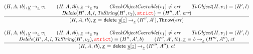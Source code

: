 \[\begin{array}{l@{~~}l@{~~}ll}
\frac{\begin{matrix}
\evale, \ir{y} \rightarrow_{\ir\expr} v_1
\rulesep
\evale, \ir{z} \rightarrow_{\ir\expr} v_2
\rulesep
\hf{CheckObjectCoercible}(v_1) \not= \err
\rulesep
\hf{ToObject}(H, v_1) = (H',l)
\\
\hf{Delete}(H', A, l, \hf{ToString}(H',v_2), \strict) = (H'', A', \err)
\end{matrix}}{\begin{matrix}
\state, \irdelprop \rightarrow_{\ir\stmt} (H'',A'), \error
\end{matrix}}
\\\\

\frac{\begin{matrix}
\evale, \ir{y} \rightarrow_{\ir\expr} v_1
\rulesep
\evale, \ir{z} \rightarrow_{\ir\expr} v_2
\rulesep
\hf{CheckObjectCoercible}(v_1) \not= \err
\rulesep
\hf{ToObject}(H, v_1) = (H',l)
\\
\hf{Delete}(H', A, l, \hf{ToString}(H',v_2), \strict) = (H'', A', b)
\rulesep
(H'',A',\tb), \irid \ {\tt =} \ b \rightarrow_{\ir\stmt} (H''',A''), \ct
\end{matrix}}{\begin{matrix}
\state, \irdelprop \rightarrow_{\ir\stmt} (H''',A''), \ct
\end{matrix}}

\\[2em]



\end{array}
\]


